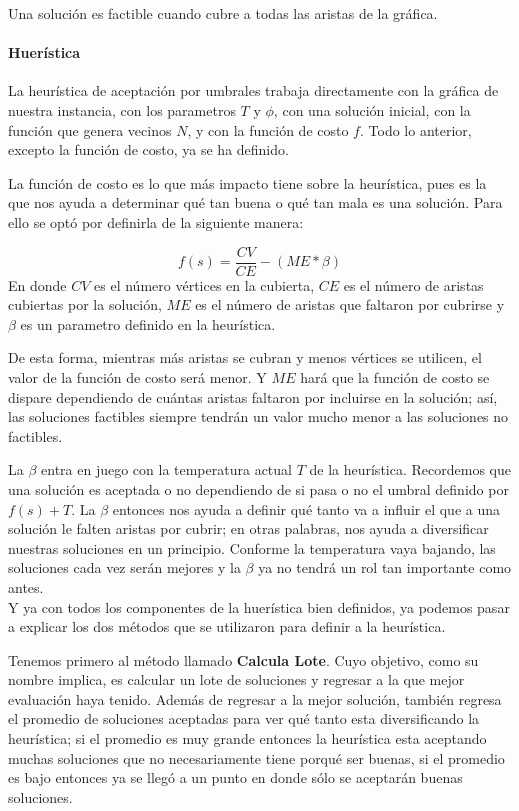 \documentclass{article}
\newcommand{\tbf}[1]{\textbf{#1}}
\begin{document}
  Una solución es factible cuando cubre a todas las aristas de la gráfica.

  \paragraph{Huerística}

  La heurística de aceptación por umbrales trabaja directamente con 
  la gráfica de nuestra instancia, con los parametros $T$ y $\phi$, 
  con una solución inicial, con la función que genera vecinos $N$, y 
  con la función de costo $f$. Todo lo anterior, excepto la función de 
  costo, ya se ha definido.

  La función de costo es lo que más impacto tiene sobre la heurística, 
  pues es la que nos ayuda a determinar qué tan buena o qué tan mala 
  es una solución. Para ello se optó por definirla de la siguiente 
  manera:

  \begin{equation}
    f(s) = \frac{CV}{CE} - (ME * \beta)
  \end{equation}
  En donde $CV$ es el número vértices en la cubierta, $CE$ es el 
  número de aristas cubiertas por la solución, $ME$ es el número 
  de aristas que faltaron por cubrirse y $\beta$ es un parametro
  definido en la heurística.

  De esta forma, mientras más aristas se cubran y menos vértices 
  se utilicen, el valor de la función de costo será menor. Y 
  $ME$ hará que la función de costo se dispare dependiendo de 
  cuántas aristas faltaron por incluirse en la solución; así,
  las soluciones factibles siempre tendrán un valor mucho 
  menor a las soluciones no factibles.

  La $\beta$ entra en juego con la temperatura actual $T$ de la 
  heurística. Recordemos que una solución es aceptada o no 
  dependiendo de si pasa o no el umbral definido por $f(s) + T$.
  La $\beta$ entonces nos ayuda a definir qué tanto va a influir 
  el que a una solución le falten aristas por cubrir; en otras
  palabras, nos ayuda a diversificar nuestras soluciones en un 
  principio. Conforme la temperatura vaya bajando, las soluciones
  cada vez serán mejores y la $\beta$ ya no tendrá un rol 
  tan importante como antes. \\

  Y ya con todos los componentes de la huerística bien definidos,
  ya podemos pasar a explicar los dos métodos que se utilizaron
  para definir a la heurística.

  Tenemos primero al método llamado \tbf{Calcula Lote}. Cuyo 
  objetivo, como su nombre implica, es calcular un lote de 
  soluciones y regresar a la que mejor evaluación haya tenido.
  Además de regresar a la mejor solución, también regresa 
  el promedio de soluciones aceptadas para ver qué tanto
  esta diversificando la heurística; si el promedio es muy 
  grande entonces la heurística esta aceptando muchas soluciones
  que no necesariamente tiene porqué ser buenas, si el promedio 
  es bajo entonces ya se llegó a un punto en donde sólo 
  se aceptarán buenas soluciones.
\end{document}
